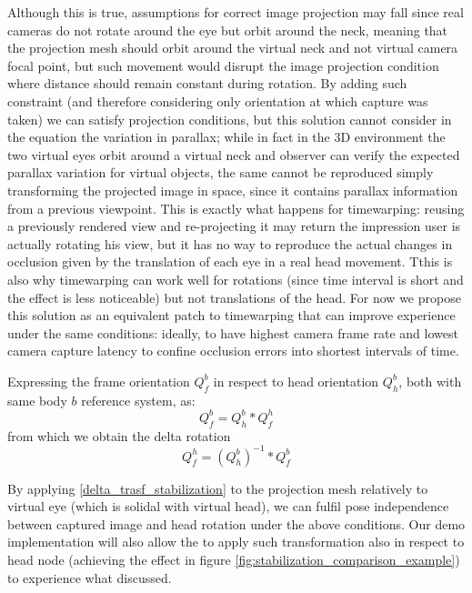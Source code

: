 Although this is true, assumptions for correct image projection may fall since real cameras do not rotate around the eye but orbit around the neck, meaning that the projection mesh should orbit around the virtual neck and not virtual camera focal point, but such movement would disrupt the image projection condition where distance should remain constant during rotation. By adding such constraint (and therefore considering only orientation at which capture was taken) we can satisfy projection conditions, but this solution cannot consider in the equation the variation in parallax; while in fact in the 3D environment the two virtual eyes orbit around a virtual neck and observer can verify the expected parallax variation for virtual objects, the same cannot be reproduced simply transforming the projected image in space, since it contains parallax information from a previous viewpoint. This is exactly what happens for timewarping: reusing a previously rendered view and re-projecting it may return the impression user is actually rotating his view, but it has no way to reproduce the actual changes in occlusion given by the translation of each eye in a real head movement. Tthis is also why timewarping can work well for rotations (since time interval is short and the effect is less noticeable) but not translations of the head. For now we propose this solution as an equivalent patch to timewarping that can improve experience under the same conditions: ideally, to have highest camera frame rate and lowest camera capture latency to confine occlusion errors into shortest intervals of time.

Expressing the frame orientation $Q^{b}_{f}$ in respect to head orientation $Q^{b}_{h}$, both with same body $b$ reference system, as:
\begin{equation}
Q^{b}_{f}=Q^{b}_{h}*Q^{h}_{f}
\end{equation}
from which we obtain the delta rotation
\begin{equation}
Q^{h}_{f}=(Q^{b}_{h})^{-1}*Q^{b}_{f}
\label{delta_trasf_stabilization}
\end{equation}

By applying \ref{delta_trasf_stabilization} to the projection mesh relatively to virtual eye (which is solidal with virtual head), we can fulfil pose independence between captured image and head rotation under the above conditions. Our demo implementation will also allow the to apply such transformation also in respect to head node (achieving the effect in figure \ref{fig:stabilization_comparison_example}) to experience what discussed.

